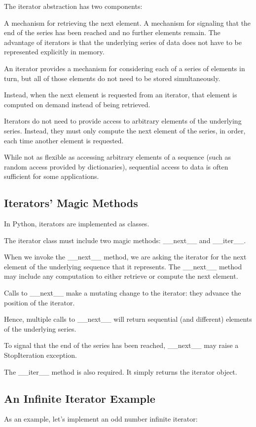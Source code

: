 \documentclass{article}
\begin{document}
The iterator abstraction has two components: 

A mechanism for retrieving the next element.
A mechanism for signaling that the end of the series has been reached and no further elements remain. 
The advantage of iterators is that the underlying series of data does not have to be represented explicitly in memory. 

An iterator provides a mechanism for considering each of a series of elements in turn, but all of those elements do not need to be stored simultaneously. 

Instead, when the next element is requested from an iterator, that element is computed on demand instead of being retrieved.

Iterators do not need to provide access to arbitrary elements of the underlying series. Instead, they must only compute the next element of the series, in order, each time another element is requested. 

While not as flexible as accessing arbitrary elements of a sequence (such as random access provided by dictionaries), sequential access to data is often sufficient for some applications.


\subsection{Iterators' Magic Methods}
In Python, iterators are implemented as classes.

The iterator class must include two magic methods:   {\_}{\_}next{\_}{\_} and {\_}{\_}iter{\_}{\_}.

When we invoke the {\_}{\_}next{\_}{\_} method, we are asking the iterator for the next element of the underlying sequence that it represents.   The {\_}{\_}next{\_}{\_} method may include any computation to either retrieve or compute the next element. 

Calls to {\_}{\_}next{\_}{\_} make a mutating change to the iterator: they advance the position of the iterator. 

Hence, multiple calls to {\_}{\_}next{\_}{\_} will return  sequential (and different) elements of the  underlying series. 

To signal that the end of the series has been reached, {\_}{\_}next{\_}{\_} may raise a StopIteration exception.

The {\_}{\_}iter{\_}{\_} method is also required.  It simply returns the iterator object.

\subsection{An Infinite Iterator Example}
As an example, let's implement an odd number infinite iterator:
\end{document}
